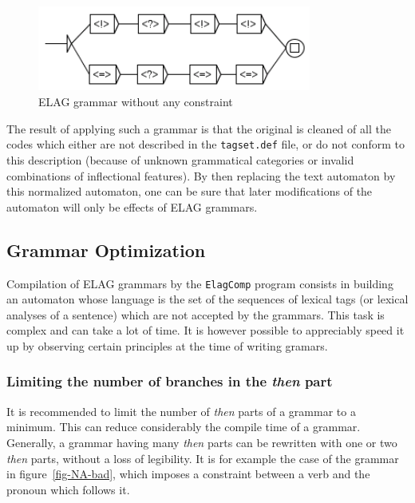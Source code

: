 \begin{figure}[!ht]
\begin{center}
\includegraphics[width=9cm]{resources/img/fig7-20.png}
\caption{ELAG grammar without any constraint\label{fig-elag-norm}}
\end{center}
\end{figure}

\bigskip
\noindent The result of applying such a grammar is that the
original is cleaned of all the codes which either are not described in the \verb$tagset.def$
file, or do not conform to this description
(because of unknown grammatical categories or invalid combinations of
inflectional features). By then replacing the text automaton by this normalized
automaton, one can be sure that later modifications of the automaton will only be
effects of ELAG grammars.


\subsection{Grammar Optimization}
Compilation of ELAG grammars by the \verb+ElagComp+ program
 consists in building an automaton
whose language is the set of the sequences of lexical tags (or lexical analyses of a sentence) which
are not accepted by the grammars. This task is complex and can take a lot of
time. It is however possible to appreciably speed it up by observing certain
principles at the time of writing gramars.

\subsubsection{Limiting the number of branches in the \textit{then} part}
It is recommended to limit the number of \textit{then} parts of a grammar to a
minimum. This can reduce considerably the compile time of a grammar. Generally, a grammar
having many \textit{then} parts can be rewritten with one or two \textit{then} parts, without a
loss of legibility. It is for example the case of the grammar in
figure~\ref{fig-NA-bad}, which imposes a constraint between a verb and the
pronoun which follows it.

